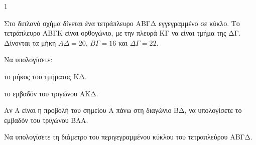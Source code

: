 \begin{ylh}{1}
    \item[Ευκλείδεια Γεωμετρία]
\end{ylh}
\begin{figure}
    \centering
\end{figure}
Στο διπλανό σχήμα δίνεται ένα τετράπλευρο ΑΒΓΔ εγγεγραμμένο σε κύκλο. Το τετράπλευρο ΑΒΓΚ είναι ορθογώνιο, με την πλευρά ΚΓ να είναι τμήμα της ΔΓ. Δίνονται τα μήκη $ΑΔ=20$, $ΒΓ=16$ και $ΔΓ=22$.

\begin{alist}
    \item Να υπολογίσετε:
    \begin{rlist}
        \item το μήκος του τμήματος ΚΔ. 
        \item το εμβαδόν του τριγώνου ΑΚΔ. 
    \end{rlist}
    \item Αν Λ είναι η προβολή του σημείου Α πάνω στη διαγώνιο ΒΔ, να υπολογίσετε το εμβαδόν του τριγώνου ΒΛΑ. 
    \item Να υπολογίσετε τη διάμετρο του περιγεγραμμένου κύκλου του τετραπλεύρου ΑΒΓΔ. 
\end{alist}